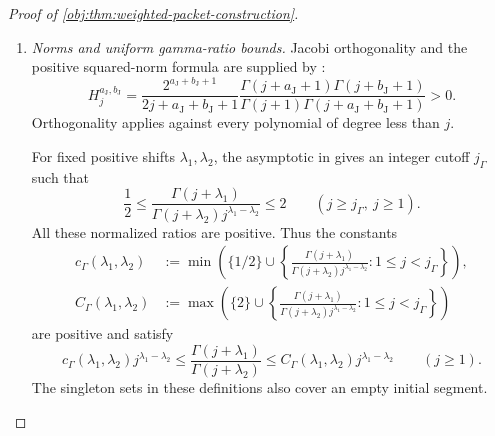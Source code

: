\begin{proof}[Proof of \cref{obj:thm:weighted-packet-construction}]
\begin{enumerate}
\[\begin{split}
&\qquad\le
\frac{C_{\mathrm{lip},\tau}^{a_{\mathrm J},b_{\mathrm J}}m^2
      \delta_{\mathrm{ang}}(z_1,\xi)}
{\sqrt{\mathcal W_{a_{\mathrm J},b_{\mathrm J}}(m;z_2)
       \mathcal W_{a_{\mathrm J},b_{\mathrm J}}(m;\zeta)}
 (1+m\delta_{\mathrm{ang}}(z_2,\zeta))^\tau},
\end{split}
\]
whenever \(z_1,z_2,\xi,\zeta\in[-1,1]\) and
\[
\delta_{\mathrm{ang}}(z_1,\xi)\le m^{-1},
\qquad
\delta_{\mathrm{ang}}(\zeta,\xi)\le m^{-1}.
\]
The parameter and filter hypotheses hold for both Jacobi systems used below.

\item \emph{Norms and uniform gamma-ratio bounds.}
Jacobi orthogonality and the positive squared-norm formula are supplied by
\citep[Table~18.3.1, Jacobi row and caption]{https://dlmf.nist.gov/18.3}:
\[
H_j^{a_{\mathrm J},b_{\mathrm J}}
=
\frac{2^{a_{\mathrm J}+b_{\mathrm J}+1}}
     {2j+a_{\mathrm J}+b_{\mathrm J}+1}
\frac{\Gamma(j+a_{\mathrm J}+1)\Gamma(j+b_{\mathrm J}+1)}
     {\Gamma(j+1)\Gamma(j+a_{\mathrm J}+b_{\mathrm J}+1)}
>0.
\]
Orthogonality applies against every polynomial of degree less than \(j\).

For fixed positive shifts \(\lambda_1,\lambda_2\), the asymptotic in
\citep[Equation~5.11.12]{https://dlmf.nist.gov/5.11.E12}
gives an integer cutoff \(j_\Gamma\) such that
\[
\frac12
\le
\frac{\Gamma(j+\lambda_1)}
     {\Gamma(j+\lambda_2)j^{\lambda_1-\lambda_2}}
\le2
\qquad(j\ge j_\Gamma,\ j\ge1).
\]
All these normalized ratios are positive. Thus the constants
\[
\begin{split}
c_\Gamma(\lambda_1,\lambda_2)
&:=
\min\left(
\{1/2\}\cup
\left\{
\frac{\Gamma(j+\lambda_1)}
     {\Gamma(j+\lambda_2)j^{\lambda_1-\lambda_2}}
:1\le j<j_\Gamma
\right\}\right),\\
C_\Gamma(\lambda_1,\lambda_2)
&:=
\max\left(
\{2\}\cup
\left\{
\frac{\Gamma(j+\lambda_1)}
     {\Gamma(j+\lambda_2)j^{\lambda_1-\lambda_2}}
:1\le j<j_\Gamma
\right\}\right)
\end{split}
\]
are positive and satisfy
\[
c_\Gamma(\lambda_1,\lambda_2)j^{\lambda_1-\lambda_2}
\le
\frac{\Gamma(j+\lambda_1)}{\Gamma(j+\lambda_2)}
\le
C_\Gamma(\lambda_1,\lambda_2)j^{\lambda_1-\lambda_2}
\qquad(j\ge1).
\]
The singleton sets in these definitions also cover an empty initial segment.


\end{enumerate}
\end{proof}
